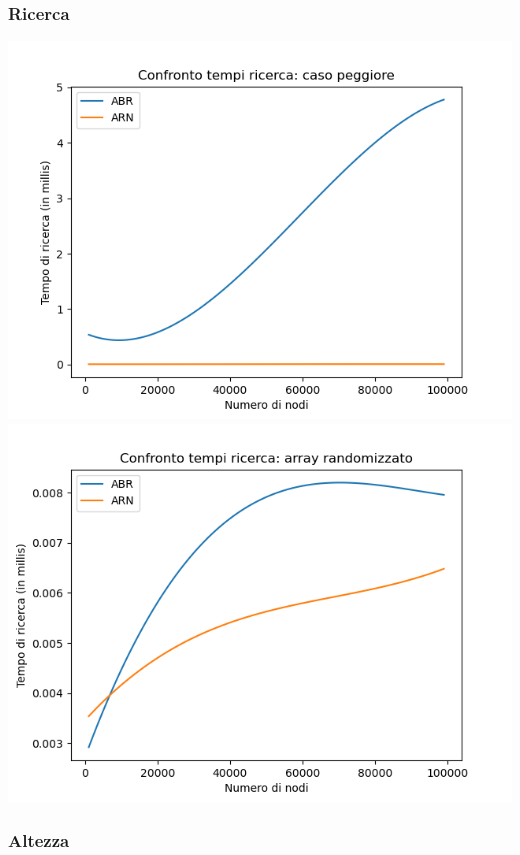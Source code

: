 \documentclass[
]{article}
\begin{document}
\hypertarget{ricerca}{%
\subsubsection{Ricerca}\label{ricerca}}
\includegraphics{../../img/w_case/s.png}
\includegraphics{../../img/rand/s.png}

\hypertarget{altezza}{%
\subsubsection{Altezza}\label{altezza}}
\end{document}
